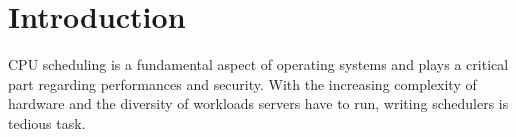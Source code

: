\section{Introduction}

\par CPU scheduling is a fundamental aspect of operating systems and plays a critical part regarding performances and security. With the increasing complexity of hardware and the diversity of workloads servers have to run, writing schedulers is tedious task. 